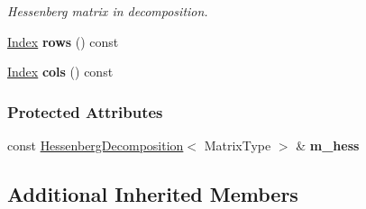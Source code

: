 \begin{DoxyCompactItemize}
\begin{DoxyCompactList}\small\item\em Hessenberg matrix in decomposition. \end{DoxyCompactList}\item 
\mbox{\label{group___eigenvalues___module_ad0a6e19c33a4feb42b7ced19ea9aa28b}} 
\hyperlink{namespace_eigen_a62e77e0933482dafde8fe197d9a2cfde}{Index} {\bfseries rows} () const
\item 
\mbox{\label{group___eigenvalues___module_a1a5dc498ba22dd3c627701548b2da6a1}} 
\hyperlink{namespace_eigen_a62e77e0933482dafde8fe197d9a2cfde}{Index} {\bfseries cols} () const
\end{DoxyCompactItemize}
\subsubsection*{Protected Attributes}
\begin{DoxyCompactItemize}
\item 
\mbox{\label{group___eigenvalues___module_aac7dc037b8fbd68a243df2e0543c76e1}} 
const \hyperlink{group___eigenvalues___module_class_eigen_1_1_hessenberg_decomposition}{Hessenberg\+Decomposition}$<$ Matrix\+Type $>$ \& {\bfseries m\+\_\+hess}
\end{DoxyCompactItemize}
\subsection*{Additional Inherited Members}


